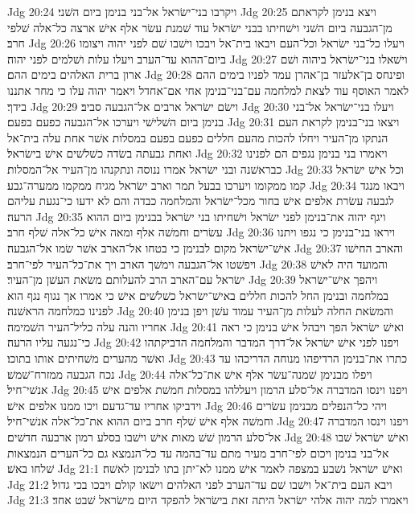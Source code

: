 Jdg 20:24  ויקרבו בני־ישׂראל אל־בני בנימן ביום השׁני׃
Jdg 20:25  ויצא בנימן לקראתם מן־הגבעה ביום השׁני וישׁחיתו בבני ישׂראל עוד שׁמנת עשׂר אלף אישׁ ארצה כל־אלה שׁלפי חרב׃
Jdg 20:26  ויעלו כל־בני ישׂראל וכל־העם ויבאו בית־אל ויבכו וישׁבו שׁם לפני יהוה ויצומו ביום־ההוא עד־הערב ויעלו עלות ושׁלמים לפני יהוה׃
Jdg 20:27  וישׁאלו בני־ישׂראל ביהוה ושׁם ארון ברית האלהים בימים ההם׃
Jdg 20:28  ופינחס בן־אלעזר בן־אהרן עמד לפניו בימים ההם לאמר האוסף עוד לצאת למלחמה עם־בני־בנימן אחי אם־אחדל ויאמר יהוה עלו כי מחר אתננו בידך׃
Jdg 20:29  וישׂם ישׂראל ארבים אל־הגבעה סביב׃
Jdg 20:30  ויעלו בני־ישׂראל אל־בני בנימן ביום השׁלישׁי ויערכו אל־הגבעה כפעם בפעם׃
Jdg 20:31  ויצאו בני־בנימן לקראת העם הנתקו מן־העיר ויחלו להכות מהעם חללים כפעם בפעם במסלות אשׁר אחת עלה בית־אל ואחת גבעתה בשׂדה כשׁלשׁים אישׁ בישׂראל׃
Jdg 20:32  ויאמרו בני בנימן נגפים הם לפנינו כבראשׁנה ובני ישׂראל אמרו ננוסה ונתקנהו מן־העיר אל־המסלות׃
Jdg 20:33  וכל אישׁ ישׂראל קמו ממקומו ויערכו בבעל תמר וארב ישׂראל מגיח ממקמו ממערה־גבע׃
Jdg 20:34  ויבאו מנגד לגבעה עשׂרת אלפים אישׁ בחור מכל־ישׂראל והמלחמה כבדה והם לא ידעו כי־נגעת עליהם הרעה׃
Jdg 20:35  ויגף יהוה את־בנימן לפני ישׂראל וישׁחיתו בני ישׂראל בבנימן ביום ההוא עשׂרים וחמשׁה אלף ומאה אישׁ כל־אלה שׁלף חרב׃
Jdg 20:36  ויראו בני־בנימן כי נגפו ויתנו אישׁ־ישׂראל מקום לבנימן כי בטחו אל־הארב אשׁר שׂמו אל־הגבעה׃
Jdg 20:37  והארב החישׁו ויפשׁטו אל־הגבעה וימשׁך הארב ויך את־כל־העיר לפי־חרב׃
Jdg 20:38  והמועד היה לאישׁ ישׂראל עם־הארב הרב להעלותם משׂאת העשׁן מן־העיר׃
Jdg 20:39  ויהפך אישׁ־ישׂראל במלחמה ובנימן החל להכות חללים באישׁ־ישׂראל כשׁלשׁים אישׁ כי אמרו אך נגוף נגף הוא לפנינו כמלחמה הראשׁנה׃
Jdg 20:40  והמשׂאת החלה לעלות מן־העיר עמוד עשׁן ויפן בנימן אחריו והנה עלה כליל־העיר השׁמימה׃
Jdg 20:41  ואישׁ ישׂראל הפך ויבהל אישׁ בנימן כי ראה כי־נגעה עליו הרעה׃
Jdg 20:42  ויפנו לפני אישׁ ישׂראל אל־דרך המדבר והמלחמה הדביקתהו ואשׁר מהערים משׁחיתים אותו בתוכו׃
Jdg 20:43  כתרו את־בנימן הרדיפהו מנוחה הדריכהו עד נכח הגבעה ממזרח־שׁמשׁ׃
Jdg 20:44  ויפלו מבנימן שׁמנה־עשׂר אלף אישׁ את־כל־אלה אנשׁי־חיל׃
Jdg 20:45  ויפנו וינסו המדברה אל־סלע הרמון ויעללהו במסלות חמשׁת אלפים אישׁ וידביקו אחריו עד־גדעם ויכו ממנו אלפים אישׁ׃
Jdg 20:46  ויהי כל־הנפלים מבנימן עשׂרים וחמשׁה אלף אישׁ שׁלף חרב ביום ההוא את־כל־אלה אנשׁי־חיל׃
Jdg 20:47  ויפנו וינסו המדברה אל־סלע הרמון שׁשׁ מאות אישׁ וישׁבו בסלע רמון ארבעה חדשׁים׃
Jdg 20:48  ואישׁ ישׂראל שׁבו אל־בני בנימן ויכום לפי־חרב מעיר מתם עד־בהמה עד כל־הנמצא גם כל־הערים הנמצאות שׁלחו באשׁ׃
Jdg 21:1  ואישׁ ישׂראל נשׁבע במצפה לאמר אישׁ ממנו לא־יתן בתו לבנימן לאשׁה׃
Jdg 21:2  ויבא העם בית־אל וישׁבו שׁם עד־הערב לפני האלהים וישׂאו קולם ויבכו בכי גדול׃
Jdg 21:3  ויאמרו למה יהוה אלהי ישׂראל היתה זאת בישׂראל להפקד היום מישׂראל שׁבט אחד׃
